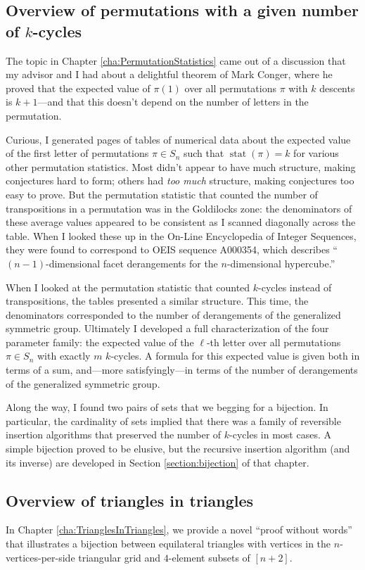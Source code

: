 \subsection{Overview of permutations with a given number of \texorpdfstring{$k$}{k}-cycles}
The topic in Chapter \ref{cha:PermutationStatistics}
came out of a discussion that my advisor and I had about a delightful
theorem of Mark Conger, where he proved that the expected value of $\pi(1)$
over all permutations $\pi$ with $k$ descents is $k + 1$---and that this doesn't
depend on the number of letters in the permutation.

Curious, I generated pages of tables of numerical data about the expected value
of the first letter of permutations $\pi \in S_n$ such that
$\operatorname{stat}(\pi) = k$ for various other permutation statistics.
Most didn't appear to have much structure, making conjectures hard to form;
others had \textit{too much} structure, making conjectures too easy to
prove.
But the permutation statistic that counted the number of transpositions in a
permutation was in the Goldilocks zone: the denominators of these average
values appeared to be consistent as I scanned diagonally across the table.
When I looked these up in the On-Line Encyclopedia of Integer Sequences,
they were found to correspond to OEIS sequence A000354, which describes
``$(n-1)$-dimensional facet derangements for the $n$-dimensional hypercube.''

When I looked at the permutation statistic that counted $k$-cycles instead of
transpositions, the tables presented a similar structure. This time, the
denominators corresponded to the number of derangements of the generalized
symmetric group. Ultimately I developed a full characterization of the four
parameter family: the expected value of the $\ell$-th letter over all
permutations $\pi \in S_n$ with exactly $m$ $k$-cycles.
A formula for this expected value is given both in terms of a sum,
and---more satisfyingly---in terms of the number of derangements of the
 generalized symmetric group.

Along the way, I found two pairs of sets that we begging for a bijection.
In particular, the cardinality of sets implied that there was a
family of reversible insertion algorithms that preserved the number of
$k$-cycles in most cases. A simple bijection proved to be elusive, but
the recursive insertion algorithm (and its inverse) are developed in
Section \ref{section:bijection} of that chapter.

\subsection{Overview of triangles in triangles}
In Chapter \ref{cha:TrianglesInTriangles}, we provide a novel
``proof without words'' that illustrates a bijection between
equilateral triangles with vertices in the $n$-vertices-per-side
triangular grid and $4$-element subsets of $[n + 2]$.

